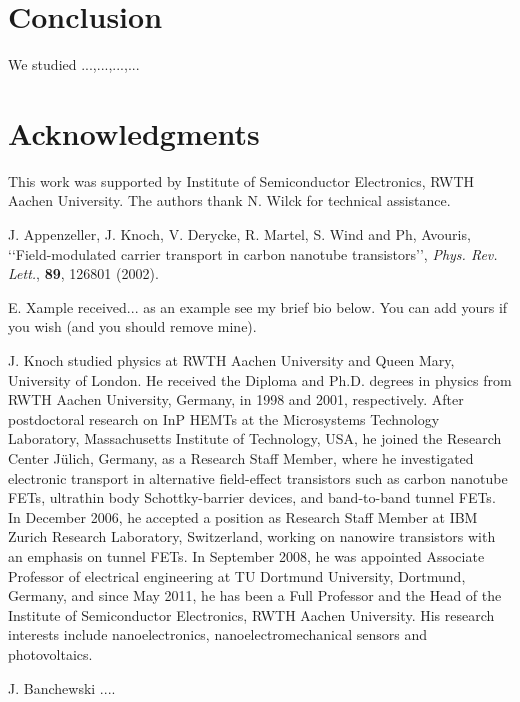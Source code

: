 \documentclass[journal]{IEEEtran} %
\begin{document}
\section{Conclusion}
We studied ...,...,...,...

\section*{Acknowledgments}
This work was supported by Institute of Semiconductor Electronics, RWTH Aachen University. The authors thank N. Wilck for technical assistance.

\begin{thebibliography}{10}\footnotesize
{} J. Appenzeller, J. Knoch, V. Derycke, R. Martel, S. Wind and Ph, Avouris, \lq\lq Field-modulated carrier transport in carbon nanotube transistors\rq\rq, {\it Phys. Rev. Lett.}, {\bf 89}, 126801 (2002).
\end{thebibliography}

\begin{IEEEbiography}{E. Xample} received... as an example see my brief bio below. You can add yours if you wish (and you should remove mine).
\end{IEEEbiography}
\begin{IEEEbiography}{J. Knoch} studied physics at RWTH Aachen University and Queen Mary, University of London. He received the Diploma and Ph.D. degrees in physics from RWTH Aachen University, Germany, in 1998 and 2001, respectively. After postdoctoral research on InP HEMTs at the Microsystems Technology Laboratory, Massachusetts Institute of Technology, USA, he joined the Research Center J\"ulich, Germany, as a Research Staff Member, where he investigated electronic transport in alternative field-effect transistors such as carbon nanotube FETs, ultrathin body Schottky-barrier devices, and band-to-band tunnel FETs. In December 2006, he accepted a position as Research Staff Member at IBM Zurich Research Laboratory, Switzerland, working on nanowire transistors with an emphasis on tunnel FETs. In September 2008, he was appointed Associate Professor of electrical engineering at TU Dortmund University, Dortmund, Germany, and since May 2011, he has been a Full Professor and the Head of the Institute of Semiconductor Electronics, RWTH Aachen University. His research interests include nanoelectronics, nanoelectromechanical sensors and photovoltaics.
\end{IEEEbiography}
\begin{IEEEbiography}{J. Banchewski} ....
\end{IEEEbiography}
\end{document}
